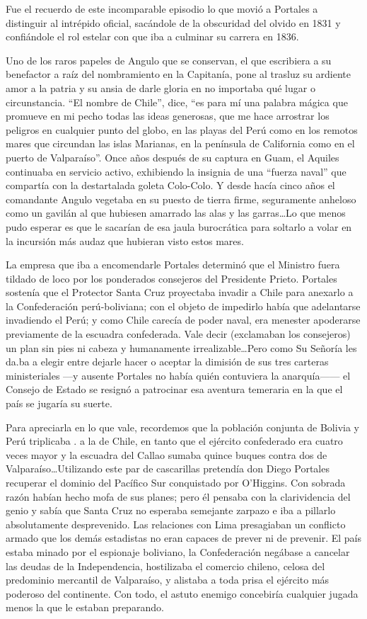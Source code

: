 \documentclass[10pt,twoside,openright]{memoir}
\begin{document}
Fue el recuerdo de este incomparable episodio lo que movió a Portales a
distinguir al intrépido oficial, sacándole de la obscuridad del olvido
en 1831 y confiándole el rol estelar con que iba a culminar su carrera
en 1836.

Uno de los raros papeles de Angulo que se conservan, el que escribiera a
su benefactor a raíz del nombramiento en la Capitanía, pone al trasluz
su ardiente amor a la patria y su ansia de darle gloria en no importaba
qué lugar o circunstancia. ``El nombre de Chile'', dice, ``es para mí una
palabra mágica que promueve en mi pecho todas las ideas generosas, que
me hace arrostrar los peligros en cualquier punto del globo, en las
playas del Perú como en los remotos mares que circundan las islas
Marianas, en la península de California como en el puerto de
Valparaíso''. Once años después de su captura en Guam, el Aquiles
continuaba en servicio activo, exhibiendo la insignia de una ``fuerza
naval'' que compartía con la destartalada goleta Colo-Colo. Y desde hacía
cinco años el comandante Angulo vegetaba en su puesto de tierra firme,
seguramente anheloso como un gavilán al que hubiesen amarrado las alas y
las garras\ldots Lo que menos pudo esperar es que le sacarían de esa jaula
burocrática para soltarlo a volar en la incursión más audaz que hubieran
visto estos mares.

La empresa que iba a encomendarle Portales determinó que el Ministro
fuera tildado de loco por los ponderados consejeros del Presidente
Prieto. Portales sostenía que el Protector Santa Cruz proyectaba invadir
a Chile para anexarlo a la Confederación perú-boliviana; con el objeto
de impedirlo había que adelantarse invadiendo el Perú; y como Chile
carecía de poder naval, era menester apoderarse previamente de la
escuadra confederada. Vale decir (exclamaban los consejeros) un plan sin
pies ni cabeza y humanamente irrealizable\ldots Pero como Su Señoría les
da.ba a elegir entre dejarle hacer o aceptar la dimisión de sus tres
carteras ministeriales ---y ausente Portales no había quién contuviera
la anarquía------ el Consejo de Estado se resignó a patrocinar esa
aventura temeraria en la que el país se jugaría su suerte.

Para apreciarla en lo que vale, recordemos que la población conjunta de
Bolivia y Perú triplicaba . a la de Chile, en tanto que el ejército
confederado era cuatro veces mayor y la escuadra del Callao sumaba
quince buques contra dos de Valparaíso\ldots Utilizando este par de
cascarillas pretendía don Diego Portales recuperar el dominio del
Pacífico Sur conquistado por O'Higgins. Con sobrada razón habían hecho
mofa de sus planes; pero él pensaba con la clarividencia del genio y
sabía que Santa Cruz no esperaba semejante zarpazo e iba a pillarlo
absolutamente desprevenido. Las relaciones con Lima presagiaban un
conflicto armado que los demás estadistas no eran capaces de prever ni
de prevenir. El país estaba minado por el espionaje boliviano, la
Confederación negábase a cancelar las deudas de la Independencia,
hostilizaba el comercio chileno, celosa del predominio mercantil de
Valparaíso, y alistaba a toda prisa el ejército más poderoso del
continente. Con todo, el astuto enemigo concebiría cualquier jugada
menos la que le estaban preparando.
\end{document}

